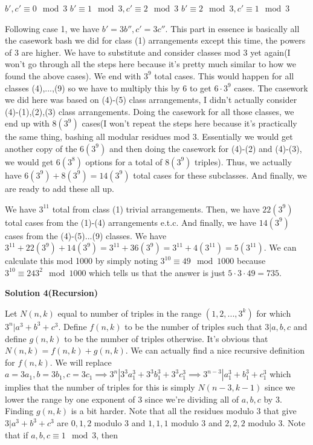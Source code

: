 \begin{enumerate}
 $b', c' \equiv 0\mod 3$
$b' \equiv 1\mod 3, c' \equiv 2\mod 3$
$b' \equiv 2\mod 3, c' \equiv 1\mod 3$

 Following case 1, we have $b' = 3b'', c' = 3c''$. This part in essence is basically all the casework bash we did for class (1) arrangements except this time, the powers of 3 are higher. We have to substitute and consider classes mod 3 yet again(I won't go through all the steps here because it's pretty much similar to how we found the above cases). We end with $3^{9}$ total cases. This would happen for all classes (4),...,(9) so we have to multiply this by 6 to get $6 \cdot 3^{9}$ cases. The casework we did here was based on (4)-(5) class arrangements, I didn't actually consider (4)-{(1),(2),(3)} class arrangements. Doing the casework for all those classes, we end up with $8(3^{9})$ cases(I won't repeat the steps here because it's practically the same thing, bashing all modular residues mod 3. Essentially we would get another copy of the $6(3^{9})$ and then doing the casework for (4)-(2) and (4)-(3), we would get $6(3^{8})$ options for a total of $8(3^{9})$ triples). Thus, we actually have $6(3^{9}) + 8(3^{9}) = 14(3^{9})$ total cases for these subclasses. And finally, we are ready to add these all up.

 We have $3^{11}$ total from class (1) trivial arrangements. Then, we have $22(3^{9})$ total cases from the (1)-(4) arrangements e.t.c. And finally, we have $14(3^{9})$ cases from the (4)-{(5)...(9)} classes. We have $3^{11} + 22(3^{9}) + 14(3^{9}) = 3^{11} + 36(3^{9}) = 3^{11} + 4(3^{11}) = 5(3^{11})$. We can calculate this mod 1000 by simply noting $3^{10} \equiv 49\mod 1000$ because $3^{10} \equiv 243^{2}\mod 1000$ which tells us that the answer is just $5 \cdot 3 \cdot 49 = \boxed{735}$.

 



\textbf{Solution 4(Recursion)}

Let $N(n, k)$ equal to number of triples in the range $(1, 2, ..., 3^k)$ for which $3^n | a^3 + b^3 + c^3$. Define $f(n,k)$ to be the number of triples such that $3 | a,b,c$ and define $g(n,k)$ to be the number of triples otherwise. It's obvious that $N(n, k) = f(n,k) + g(n,k)$. We can actually find a nice recursive definition for $f(n,k)$. We will replace $a = 3a_1, b = 3b_1, c = 3c_1 \implies 3^n | 3^3 a_1^3 + 3^3 b_1^3 + 3^3 c_1^3 \implies 3^{n - 3} | a_1^3 + b_1^3 + c_1^3$ which implies that the number of triples for this is simply $N(n - 3, k - 1)$ since we lower the range by one exponent of $3$ since we're dividing all of $a,b,c$ by $3$. Finding $g(n,k)$ is a bit harder. Note that all the residues modulo $3$ that give $3 | a^3 + b^3 + c^3$ are $0, 1, 2$ modulo $3$ and $1,1,1$ modulo $3$ and $2,2,2$ modulo $3$. Note that if $a, b, c \equiv 1\mod 3$, then


\end{enumerate}
